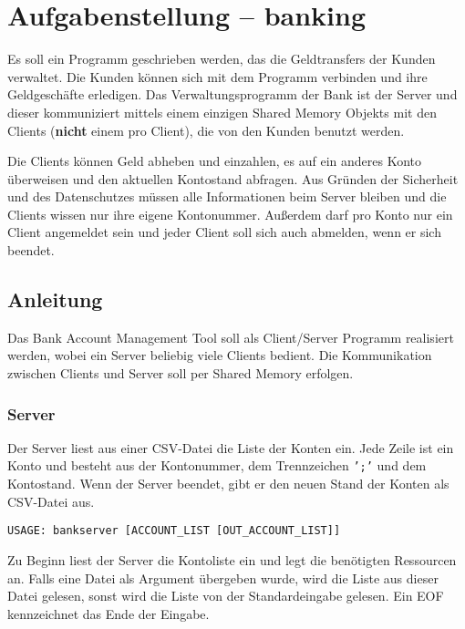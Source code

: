 




\section*{Aufgabenstellung -- banking}

Es soll ein Programm geschrieben werden, das die Geldtransfers der Kunden
verwaltet. Die Kunden können sich mit dem Programm verbinden und ihre
Geldgeschäfte erledigen. Das Verwaltungsprogramm der Bank ist der Server und
dieser kommuniziert mittels einem einzigen Shared Memory Objekts mit den
Clients (\textbf{nicht} einem pro Client), die von den Kunden benutzt werden.

Die Clients können Geld abheben und einzahlen, es auf ein anderes Konto
überweisen und den aktuellen Kontostand abfragen. Aus Gründen der Sicherheit
und des Datenschutzes müssen alle Informationen beim Server bleiben und die
Clients wissen nur ihre eigene Kontonummer. Außerdem darf pro Konto nur ein
Client angemeldet sein und jeder Client soll sich auch abmelden, wenn er sich
beendet.



\subsection*{Anleitung}

Das Bank Account Management Tool soll als Client/Server Programm realisiert
werden, wobei ein Server beliebig viele Clients bedient. Die Kommunikation
zwischen Clients und Server soll per Shared Memory erfolgen.


\subsubsection*{Server}
\label{sec:server}

Der Server liest aus einer CSV-Datei die Liste der Konten ein. Jede Zeile ist
ein Konto und besteht aus der Kontonummer, dem Trennzeichen \texttt{';'} und
dem Kontostand. Wenn der Server beendet, gibt er den neuen Stand der Konten als
CSV-Datei aus.

\begin{verbatim}
USAGE: bankserver [ACCOUNT_LIST [OUT_ACCOUNT_LIST]]
\end{verbatim}

Zu Beginn liest der Server die Kontoliste ein und legt die benötigten
Ressourcen an. Falls eine Datei als Argument übergeben wurde, wird die Liste
aus dieser Datei gelesen, sonst wird die Liste von der Standardeingabe gelesen.
Ein EOF kennzeichnet das Ende der Eingabe.

